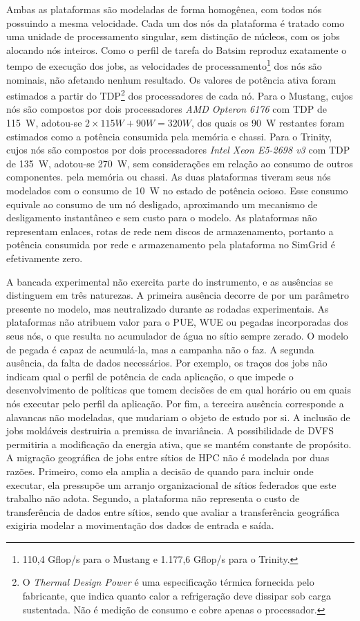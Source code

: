 Ambas as plataformas são modeladas de forma homogênea, com todos nós possuindo a mesma velocidade. Cada um dos nós da plataforma
é tratado como uma unidade de processamento singular, sem distinção de núcleos, com os jobs alocando nós inteiros. 
Como o perfil de tarefa do Batsim reproduz exatamente o tempo de execução dos jobs,
as velocidades de processamento\footnote{110,4 Gflop/s para o Mustang e 1.177,6 Gflop/s para o Trinity.} 
dos nós são nominais, não afetando nenhum resultado. Os valores de potência ativa foram
estimados a partir do TDP\footnote{O \textit{Thermal Design
Power} é uma especificação térmica fornecida pelo fabricante, que indica quanto calor a refrigeração deve dissipar
sob carga sustentada. Não é medição de consumo e cobre apenas o processador.} dos processadores de cada nó.
Para o Mustang, cujos nós são compostos por dois processadores \textit{AMD Opteron 6176} com TDP de 115~W, adotou-se $2 \times 115 W + 90 W = 320 W$, 
dos quais os 90~W restantes 
foram estimados como a potência consumida pela memória e chassi. Para o Trinity, cujos nós são compostos por dois processadores
\textit{Intel Xeon E5-2698 v3} com TDP de 135~W, adotou-se 270~W, sem considerações em relação ao consumo de outros componentes.
pela memória ou chassi. As duas plataformas tiveram seus nós modelados com o consumo de 10~W no estado de potência ocioso.
Esse consumo equivale ao consumo de um nó desligado, aproximando um mecanismo de desligamento instantâneo e sem custo para o
modelo. As plataformas não representam enlaces, rotas de rede nem discos de armazenamento, portanto
a potência consumida por rede e armazenamento pela plataforma no SimGrid é efetivamente zero. 

A bancada experimental não exercita parte do instrumento, e as ausências se distinguem em três naturezas.
A primeira ausência decorre de por um parâmetro presente no modelo, mas neutralizado durante as rodadas experimentais.
As plataformas não atribuem valor para o PUE, WUE ou pegadas incorporadas dos seus nós, o que resulta no acumulador de água
no sítio sempre zerado. O modelo de pegada é capaz de acumulá-la, mas a campanha não o faz. A segunda ausência, da falta de dados necessários. Por exemplo,
os traços dos jobs não indicam qual o perfil de potência de cada aplicação, o que impede o desenvolvimento de políticas que tomem decisões
de em qual horário ou em quais nós executar pelo perfil da aplicação. Por fim, a terceira ausência corresponde a alavancas não modeladas, que mudariam o objeto de estudo por si.
A inclusão de jobs moldáveis destruiria a premissa de invariância. A possibilidade de DVFS permitiria
a modificação da energia ativa, que se mantém constante de propósito. A migração geográfica de jobs entre sítios de HPC não é modelada
por duas razões. Primeiro, como ela amplia a decisão de quando para incluir onde executar, ela pressupõe um arranjo organizacional de 
sítios federados que este trabalho não adota. Segundo, a plataforma não representa o custo de transferência de dados entre sítios,
sendo que avaliar a transferência geográfica exigiria modelar a movimentação dos dados de entrada e saída. 

